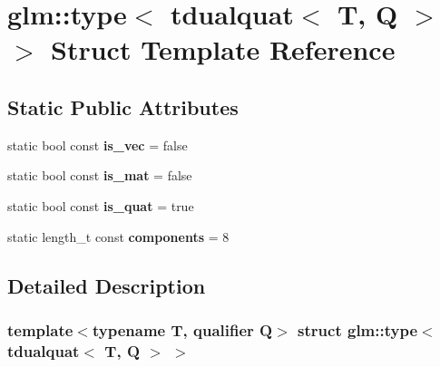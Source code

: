 \hypertarget{structglm_1_1type_3_01tdualquat_3_01T_00_01Q_01_4_01_4}{}\section{glm\+:\+:type$<$ tdualquat$<$ T, Q $>$ $>$ Struct Template Reference}
\label{structglm_1_1type_3_01tdualquat_3_01T_00_01Q_01_4_01_4}
\subsection*{Static Public Attributes}
\begin{DoxyCompactItemize}
\item 
\mbox{\label{structglm_1_1type_3_01tdualquat_3_01T_00_01Q_01_4_01_4_ab10de3a5cc6cb536a7464fbe07aadeb4}} 
static bool const {\bfseries is\+\_\+vec} = false
\item 
\mbox{\label{structglm_1_1type_3_01tdualquat_3_01T_00_01Q_01_4_01_4_a733a4f2d4dda8bcbf732ec5a8123ecc5}} 
static bool const {\bfseries is\+\_\+mat} = false
\item 
\mbox{\label{structglm_1_1type_3_01tdualquat_3_01T_00_01Q_01_4_01_4_a2205290f32121fe4f7f058c53671359e}} 
static bool const {\bfseries is\+\_\+quat} = true
\item 
\mbox{\label{structglm_1_1type_3_01tdualquat_3_01T_00_01Q_01_4_01_4_a781f382733b9a6e596b675488b2e3e74}} 
static length\+\_\+t const {\bfseries components} = 8
\end{DoxyCompactItemize}


\subsection{Detailed Description}
\subsubsection*{template$<$typename T, qualifier Q$>$\newline
struct glm\+::type$<$ tdualquat$<$ T, Q $>$ $>$}



